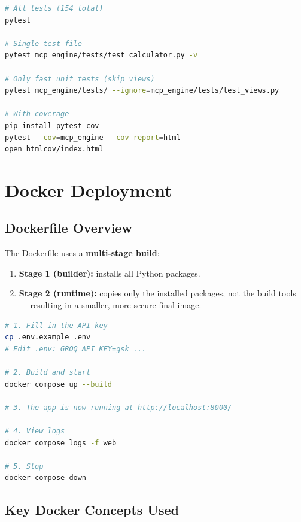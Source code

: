 \documentclass[11pt,a4paper]{article}
\begin{document}
\begin{lstlisting}[language=bash, caption={Running the test suite}]
# All tests (154 total)
pytest

# Single test file
pytest mcp_engine/tests/test_calculator.py -v

# Only fast unit tests (skip views)
pytest mcp_engine/tests/ --ignore=mcp_engine/tests/test_views.py

# With coverage
pip install pytest-cov
pytest --cov=mcp_engine --cov-report=html
open htmlcov/index.html
\end{lstlisting}

\newpage
\section{Docker Deployment}

\subsection{Dockerfile Overview}

The Dockerfile uses a \textbf{multi-stage build}:

\begin{enumerate}
  \item \textbf{Stage 1 (builder):} installs all Python packages.
  \item \textbf{Stage 2 (runtime):} copies only the installed packages,
    not the build tools — resulting in a smaller, more secure final image.
\end{enumerate}

\begin{lstlisting}[language=bash, caption={Docker usage}]
# 1. Fill in the API key
cp .env.example .env
# Edit .env: GROQ_API_KEY=gsk_...

# 2. Build and start
docker compose up --build

# 3. The app is now running at http://localhost:8000/

# 4. View logs
docker compose logs -f web

# 5. Stop
docker compose down
\end{lstlisting}

\subsection{Key Docker Concepts Used}
\end{document}
